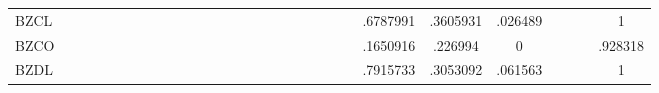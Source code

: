 \begin{table}[htbp]
\begin{tabular}{l*{4}{ccccccc}}
BZCL            &         &         &         &         &         &         &         &         &         &         &         &         &         &         &         &         &         &         &         &         &         & .6787991& .3605931&  .026489&         &         &         &        1\\
BZCO            &         &         &         &         &         &         &         &         &         &         &         &         &         &         &         &         &         &         &         &         &         & .1650916&  .226994&        0&         &         &         &  .928318\\
BZDL            &         &         &         &         &         &         &         &         &         &         &         &         &         &         &         &         &         &         &         &         &         & .7915733& .3053092&  .061563&         &         &         &        1\\
\hline\hline
\end{tabular}
\end{table}
